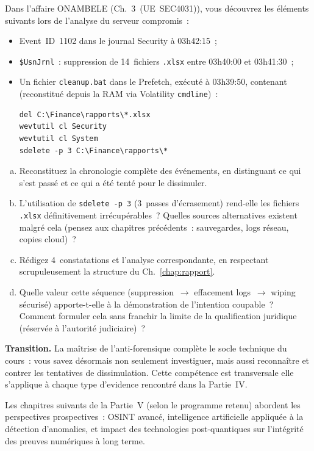 \begin{boxexo}[title={\ding{45}\quad Exercice~22.3. Investigation complète avec anti-forensique \niveauexpert}]
Dans l'affaire ONAMBELE (Ch.~3~(UE~SEC4031)), vous découvrez
les éléments suivants lors de l'analyse du serveur compromis~:
\begin{itemize}
    \item Event~ID~1102 dans le journal Security à 03h42:15~;
    \item \texttt{\$UsnJrnl}~: suppression de 14~fichiers \texttt{.xlsx}
          entre 03h40:00 et 03h41:30~;
    \item Un fichier \texttt{cleanup.bat} dans le Prefetch, exécuté
          à 03h39:50, contenant (reconstitué depuis la RAM via
          Volatility \texttt{cmdline})~:
\begin{lstlisting}[language=bash_forensique]
del C:\Finance\rapports\*.xlsx
wevtutil cl Security
wevtutil cl System
sdelete -p 3 C:\Finance\rapports\*
\end{lstlisting}
\end{itemize}
\begin{enumerate}[(a)]
    \item Reconstituez la chronologie complète des événements,
          en distinguant ce qui s'est passé et ce qui a été
          tenté pour le dissimuler.
    \item L'utilisation de \texttt{sdelete -p~3} (3~passes
          d'écrasement) rend-elle les fichiers \texttt{.xlsx}
          définitivement irrécupérables~? Quelles sources
          alternatives existent malgré cela (pensez aux chapitres
          précédents~: sauvegardes, logs réseau, copies cloud)~?
    \item Rédigez 4~constatations et l'analyse correspondante,
          en respectant scrupuleusement la structure du
          Ch.~\ref{chap:rapport}.
    \item Quelle valeur cette séquence (suppression~$\to$
          effacement logs~$\to$ wiping sécurisé) apporte-t-elle
          à la démonstration de l'intention coupable~? Comment
          formuler cela sans franchir la limite de la qualification
          juridique (réservée à l'autorité judiciaire)~?
\end{enumerate}
\end{boxexo}

\bigskip

\begin{boxinfo}
\textbf{Transition.} La maîtrise de l'anti-forensique complète le
socle technique du cours~: vous savez désormais non seulement
investiguer, mais aussi reconnaître et contrer les tentatives de
dissimulation. Cette compétence est transversale elle
s'applique à chaque type d'evidence rencontré dans la Partie~IV.

Les chapitres suivants de la Partie~V (selon le programme retenu)
abordent les perspectives prospectives~: OSINT avancé, intelligence
artificielle appliquée à la détection d'anomalies, et impact
des technologies post-quantiques sur l'intégrité des preuves
numériques à long terme.
\end{boxinfo}